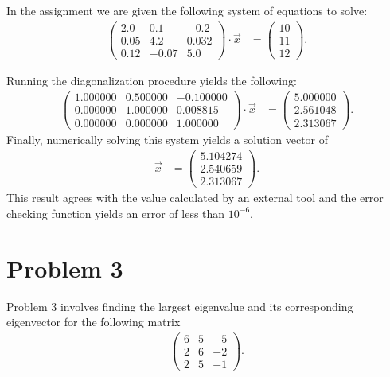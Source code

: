 \documentclass[12pt]{article}
\begin{document}
In the assignment we are given the following system of equations to solve:
\begin{align*}
	\begin{pmatrix}
		2.0 & 0.1 & -0.2\\
		0.05 & 4.2 & 0.032\\
		0.12 & -0.07 & 5.0
	\end{pmatrix}
	\cdot \vec{x} & =  \begin{pmatrix}
		10\\
		11\\
		12
	\end{pmatrix}.
\end{align*}

Running the diagonalization procedure yields the following:
\begin{align*}
	\begin{pmatrix}
		1.000000 & 0.500000 & -0.100000\\
		0.000000 & 1.000000 & 0.008815\\
		0.000000 & 0.000000 & 1.000000
	\end{pmatrix} \cdot \vec{x} & =  \begin{pmatrix}
		5.000000\\
		2.561048\\
		2.313067
	\end{pmatrix}.
\end{align*}
Finally, numerically solving this system yields a solution vector of
\begin{align*}
	\vec{x} & =  \begin{pmatrix}
		5.104274\\
		2.540659\\
		2.313067
	\end{pmatrix}.
\end{align*}
This result agrees with the value calculated by an external tool and the error checking function yields an error of less than \(10^{-6}\).

\section{Problem 3}
\label{sec:problem3}

Problem 3 involves finding the largest eigenvalue and its corresponding eigenvector for the following matrix
\begin{align*}
	\begin{pmatrix}
		6 & 5 & -5\\
		2 & 6 & -2\\
		2 & 5 & -1
	\end{pmatrix}.
\end{align*}
\end{document}
